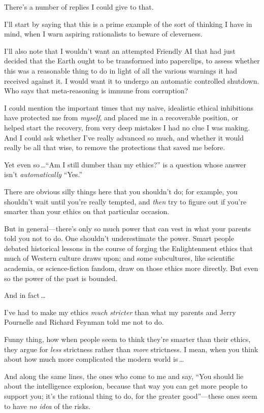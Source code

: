  There's a number of replies I could give to that.


 I'll start by saying that this is a prime example
of the sort of thinking I have in mind, when I warn aspiring
rationalists to beware of cleverness.


 I'll also note that I wouldn't
want an attempted Friendly AI that had just decided that the Earth
ought to be transformed into paperclips, to assess whether this was a
reasonable thing to do in light of all the various warnings it had
received against it. I would want it to undergo an automatic controlled
shutdown. Who says that meta-reasoning is immune from corruption?


 I could mention the important times that my naive, idealistic
ethical inhibitions have protected me from \textit{myself}, and placed
me in a recoverable position, or helped start the recovery, from very
deep mistakes I had no clue I was making. And I could ask whether
I've really advanced so much, and whether it would
really be all that wise, to remove the protections that saved me
before.


 Yet even so\,\ldots ``Am I still dumber than my
ethics?'' is a question whose answer
isn't \textit{automatically}
``Yes.''


 There are obvious silly things here that you
shouldn't do; for example, you
shouldn't wait until you're really
tempted, and \textit{then} try to figure out if you're
smarter than your ethics on that particular occasion.


 But in general---there's only so much power that
can vest in what your parents told you not to do. One
shouldn't underestimate the power. Smart people debated
historical lessons in the course of forging the Enlightenment ethics
that much of Western culture draws upon; and some subcultures, like
scientific academia, or science-fiction fandom, draw on those ethics
more directly. But even so the power of the past is bounded.


 And in fact\,\ldots


 I've had to make my ethics \textit{much stricter}
than what my parents and Jerry Pournelle and Richard Feynman told me
not to do.


 Funny thing, how when people seem to think they're
smarter than their ethics, they argue for \textit{less} strictness
rather than \textit{more} strictness. I mean, when you think about how
much more complicated the modern world is\,\ldots


 And along the same lines, the ones who come to me and say,
``You should lie about the intelligence explosion,
because that way you can get more people to support you;
it's the rational thing to do, for the greater
good''---these ones seem to have \textit{no idea} of
the risks.


